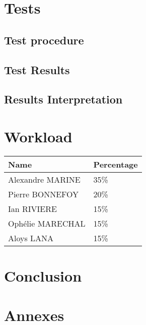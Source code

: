 \documentclass[a4paper, 11pt]{article}
\begin{document}
\section{Tests}
    \subsection{Test procedure}
    
    \subsection{Test Results}

    \subsection{Results Interpretation}

\section{Workload}
\begin{center}
    \begin{tabular}{|p{2cm}|p{2cm}|}
        \hline
        \textbf{Name} & \textbf{Percentage} \\
        \hline
        \hline
        Alexandre MARINE &  35\% \\
        \hline 
        Pierre BONNEFOY &  20\% \\
        \hline
        Ian RIVIERE & 15\% \\
        \hline
        Ophélie MARECHAL &  15\% \\
        \hline 
        Aloys LANA &  15\% \\
        \hline
    \end{tabular}
\end{center}

\section{Conclusion}

\newpage

\appendix
\section{Annexes}

\listofalgocfs
\newpage
\end{document}
